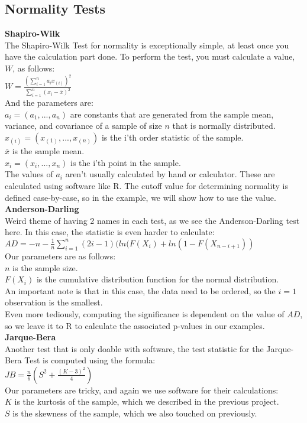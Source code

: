 \documentclass[12pt]{article}
\newcommand{\ds}{\displaystyle}
\begin{document}
\begin{flushleft}
\section{Normality Tests}\label{sec:chapter}
\textbf{Shapiro-Wilk}\\
The Shapiro-Wilk Test for normality is exceptionally simple, at least once you have the calculation part done. To perform the test, you must calculate a value, \(W\), as follows:\\
\(W = \frac{(\sum_{i=1}^{n}{a_ix_{(i)}})^2}{\sum_{i=1}^{n}{(x_i - \bar{x})^2}}\)\\
And the parameters are:\\
\(a_i = (a_1,...,a_n)\) are constants that are generated from the sample mean, variance, and covariance of a sample of size \(n\) that is normally distributed.\\
\(x_{(i)} = (x_{(1)},...,x_{(n)})\) is the i'th order statistic of the sample.\\
\(\bar{x}\) is the sample mean.\\
\(x_i = (x_i,...,x_n)\) is the i'th point in the sample.\\
The values of \(a_i\) aren't usually calculated by hand or calculator. These are calculated using software like R. The cutoff value for determining normality is defined case-by-case, so in the example, we will show how to use the value.\\

\textbf{Anderson-Darling}\\
Weird theme of having 2 names in each test, as we see the Anderson-Darling test here. In this case, the statistic is even harder to calculate:\\

\(AD = -n - \frac{1}{n}\ds \sum_{i=1}^{n}{(2i - 1)(ln(F(X_i) + ln(1 - F(X_{n - i + 1}))}\)\\
Our parameters are as follows:\\
\(n\) is the sample size.\\
\(F(X_i)\) is the cumulative distribution function for the normal distribution.\\
An important note is that in this case, the data need to be ordered, so the \(i = 1\) observation is the smallest.\\
Even more tediously, computing the significance is dependent on the value of \(AD\), so we leave it to R to calculate the associated p-values in our examples.\\

\textbf{Jarque-Bera}\\
Another test that is only doable with software, the test statistic for the Jarque-Bera Test is computed using the formula:\\
\(JB = \frac{n}{6}(S^2 + \frac{(K - 3)^2}{4})\)\\
Our parameters are tricky, and again we use software for their calculations:\\
\(K\) is the kurtosis of the sample, which we described in the previous project.\\
\(S\) is the skewness of the sample, which we also touched on previously.\\


\end{flushleft}
\end{document}

